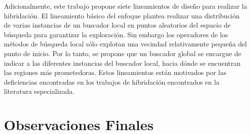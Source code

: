  Adicionalmente, este trabajo propone siete lineamientos de diseño para realizar la hibridación. El lineamiento básico del enfoque plantea realizar una distribución de varias instancias de un buscador local en puntos aleatorios del espacio de búsqueda para garantizar la exploración. Sin embargo los operadores de los métodos de búsqueda local sólo explotan una vecindad relativamente pequeña del punto de inicio. Por lo tanto, se propone que un buscador global se encargue de indicar a las diferentes instancias del buscador local, hacia dónde se encuentran las regiones más prometedoras. Estos lineamientos están motivados por las deficiencias encontradas en los trabajos de hibridación encontrados en la literatura especializada.

\section{Observaciones Finales}

